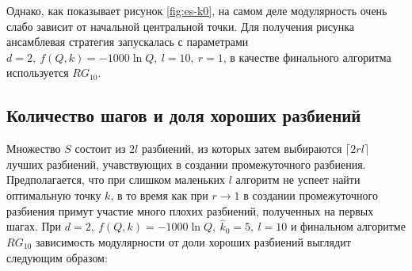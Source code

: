 Однако, как показывает рисунок \ref{fig:es-k0}, на самом деле модулярность очень слабо зависит от начальной центральной точки. Для получения рисунка ансамблевая стратегия запускалась с параметрами $d = 2,\ f(Q, k) = -1000 \ln Q,\ l = 10,\ r = 1$, в качестве финального алгоритма используется $RG_{10}$.



\subsection{Количество шагов и доля хороших разбиений}

Множество $S$ состоит из $2l$ разбиений, из которых затем выбираются $\lceil 2rl \rceil$ лучших разбиений, учавствующих в создании промежуточного разбиения. Предполагается, что при слишком маленьких $l$ алгоритм не успеет найти оптимальную точку $k$, в то время как при $r \rightarrow 1$ в создании промежуточного разбиения примут участие много плохих разбиений, полученных на первых шагах. При $d = 2,\ f(Q, k) = -1000 \ln Q,\ \hat{k}_0 = 5,\ l = 10$ и финальном алгоритме $RG_{10}$ зависимость модулярности от доли хороших разбиений выглядит следующим образом:


